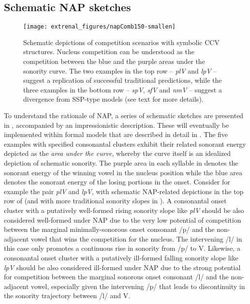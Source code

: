 \subsection{Schematic NAP sketches}\label{sec:NAPsketch}



\begin{figure}
\texttt{[image: extrenal\_figures/napComb150-smallen]}
\caption{Schematic depictions of competition scenarios with symbolic CCV structures. Nucleus competition can be understood as the competition between the blue and the purple areas under the sonority curve. The two examples in the top row -- \emph{plV} and \emph{lpV} -- suggest a replication of successful traditional predictions, while the three examples in the bottom row -- \emph{spV}, \emph{sfV} and \emph{nmV} -- suggest a divergence from SSP-type models (see text for more details).}\label{fig:nap-depictions}
\end{figure}

To understand the rationale of NAP, a series of schematic sketches are presented in , accompanied by an impressionistic description. These will eventually be implemented within formal models that are described in detail in .
The five examples with specified consonantal clusters exhibit their related sonorant energy depicted as the \emph{area under the curve}, whereby the curve itself is an idealized depiction of schematic sonority.
The purple area in each syllable in  denotes the sonorant energy of the winning vowel in the nucleus position while the blue area denotes the sonorant energy of the losing portions in the onset.
Consider for example the pair \emph{plV} and \emph{lpV}, with schematic NAP-related depictions in the top row of  (and with more traditional sonority slopes in ). A consonantal onset cluster with a putatively well-formed rising sonority slope like \emph{plV} should be also considered well-formed under NAP due to the very low potential of competition between the marginal minimally-sonorous onset consonant /p/ and the non-adjacent vowel that wins the competition for the nucleus. The intervening /l/ in this case only promotes a continuous rise in sonority from /p/ to V. Likewise, a consonantal onset cluster with a putatively ill-formed falling sonority slope like \emph{lpV} should be also considered ill-formed under NAP due to the strong potential for competition between the marginal sonorous onset consonant /l/ and the non-adjacent vowel, especially given the intervening /p/ that leads to discontinuity in the sonority trajectory between /l/ and V.

